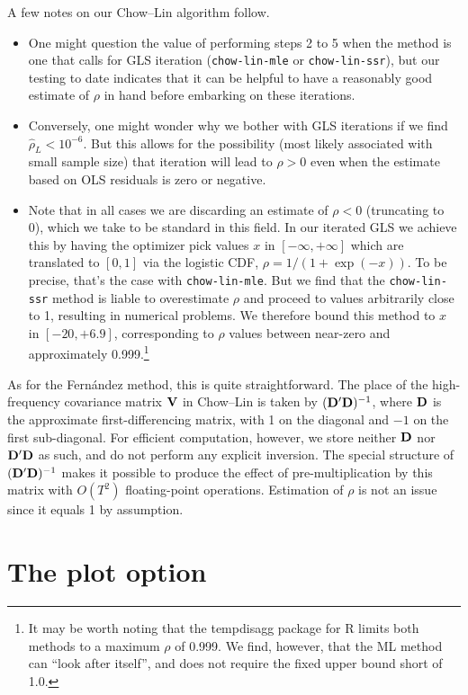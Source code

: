 A few notes on our Chow--Lin algorithm follow.
\begin{itemize}
\item One might question the value of performing steps 2 to 5 when the
  method is one that calls for GLS iteration (\texttt{chow-lin-mle} or
  \texttt{chow-lin-ssr}), but our testing to date indicates that it
  can be helpful to have a reasonably good estimate of $\rho$ in hand
  before embarking on these iterations.
\item Conversely, one might wonder why we bother with GLS iterations
  if we find $\hat{\rho}_L < 10^{-6}$. But this allows for the
  possibility (most likely associated with small sample size) that
  iteration will lead to $\rho > 0$ even when the estimate based on
  OLS residuals is zero or negative.
\item Note that in all cases we are discarding an estimate of
  $\rho < 0$ (truncating to 0), which we take to be standard in this
  field. In our iterated GLS we achieve this by having the optimizer
  pick values $x$ in $[-\infty, +\infty]$ which are translated to
  $[0,1]$ via the logistic CDF, $\rho = 1/(1 + \exp(-x))$. To be
  precise, that's the case with \texttt{chow-lin-mle}. But we find
  that the \texttt{chow-lin-ssr} method is liable to overestimate
  $\rho$ and proceed to values arbitrarily close to 1, resulting in
  numerical problems. We therefore bound this method to $x$ in
  $[-20, +6.9]$, corresponding to $\rho$ values between near-zero and
  approximately 0.999.\footnote{It may be worth noting that the
    \textsf{tempdisagg} package for R limits both methods to a maximum
    $\rho$ of 0.999. We find, however, that the ML method can ``look
    after itself'', and does not require the fixed upper bound short
    of 1.0.}
\end{itemize}

As for the Fernández method, this is quite straightforward. The place
of the high-frequency covariance matrix $\mathbf{V}$ in Chow--Lin is taken by
$(\mathbf{D}'\mathbf{D})^{-1}$, where $\mathbf{D}$ is the approximate first-differencing
matrix, with 1 on the diagonal and $-1$ on the first sub-diagonal. For
efficient computation, however, we store neither $\mathbf{D}$ nor $\mathbf{D}'\mathbf{D}$
as such, and do not perform any explicit inversion. The special
structure of $(\mathbf{D}'\mathbf{D})^{-1}$ makes it possible to produce the effect
of pre-multiplication by this matrix with ${O}(T^2)$ floating-point
operations. Estimation of $\rho$ is not an issue since it equals 1 by
assumption.

\section{The plot option}
\label{sec:tdisagg-plot}

